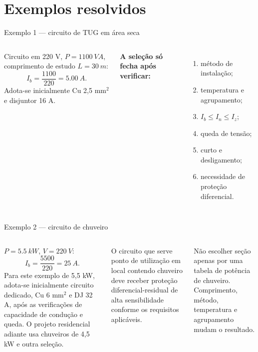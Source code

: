 \section{Exemplos resolvidos}

\begin{frame}{Exemplo 1 — circuito de TUG em área seca}
\small
\begin{columns}[T,onlytextwidth]
\begin{caixaEx}
Circuito em 220 V, $P=\SI{1100}{VA}$, comprimento de estudo $L=\SI{30}{m}$:
\[
I_b=\frac{1100}{220}=\SI{5.00}{A}.
\]
Adota-se inicialmente Cu 2,5 mm$^2$ e disjuntor 16 A.
\end{caixaEx}
\textbf{A seleção só fecha após verificar:}
\begin{enumerate}
\item método de instalação;
\item temperatura e agrupamento;
\item $I_b\le I_n\le I_z$;
\item queda de tensão;
\item curto e desligamento;
\item necessidade de proteção diferencial.
\end{enumerate}
\end{columns}
\end{frame}

\begin{frame}{Exemplo 2 — circuito de chuveiro}
\small
\begin{columns}[T,onlytextwidth]
\begin{caixaEx}
$P=\SI{5.5}{kW}$, $V=\SI{220}{V}$:
\[
I_b=\frac{5500}{220}=\SI{25}{A}.
\]
Para este exemplo de 5,5 kW, adota-se inicialmente circuito dedicado, Cu 6 mm$^2$ e DJ 32 A, após as verificações de capacidade de condução e queda. O projeto residencial adiante usa chuveiros de 4,5 kW e outra seleção.
\end{caixaEx}
\begin{caixaNorma}[title=Proteção adicional]
O circuito que serve ponto de utilização em local contendo chuveiro deve receber proteção diferencial-residual de alta sensibilidade conforme os requisitos aplicáveis.
\end{caixaNorma}
\begin{caixaAt}
Não escolher seção apenas por uma tabela de potência de chuveiro. Comprimento, método, temperatura e agrupamento mudam o resultado.
\end{caixaAt}
\end{columns}
\end{frame}

